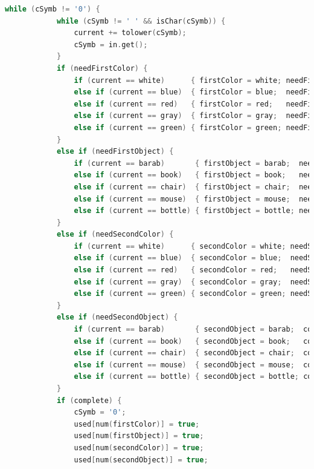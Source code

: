 \documentclass[a4paper,12pt]{article}
\begin{document}
\begin{lstlisting}[language=C++]
        while (cSymb != '0') {
            while (cSymb != ' ' && isChar(cSymb)) {
                current += tolower(cSymb);
                cSymb = in.get();
            }
            if (needFirstColor) {
                if (current == white)      { firstColor = white; needFirstObject = true; needFirstColor = false; }
                else if (current == blue)  { firstColor = blue;  needFirstObject = true; needFirstColor = false; }
                else if (current == red)   { firstColor = red;   needFirstObject = true; needFirstColor = false; }
                else if (current == gray)  { firstColor = gray;  needFirstObject = true; needFirstColor = false; }
                else if (current == green) { firstColor = green; needFirstObject = true; needFirstColor = false; }
            }
            else if (needFirstObject) {
                if (current == barab)       { firstObject = barab;  needSecondColor = true; needFirstObject = false; }
                else if (current == book)   { firstObject = book;   needSecondColor = true; needFirstObject = false; }
                else if (current == chair)  { firstObject = chair;  needSecondColor = true; needFirstObject = false; }
                else if (current == mouse)  { firstObject = mouse;  needSecondColor = true; needFirstObject = false; }
                else if (current == bottle) { firstObject = bottle; needSecondColor = true; needFirstObject = false; }
            }
            else if (needSecondColor) {
                if (current == white)      { secondColor = white; needSecondObject = true; needSecondColor = false; }
                else if (current == blue)  { secondColor = blue;  needSecondObject = true; needSecondColor = false; }
                else if (current == red)   { secondColor = red;   needSecondObject = true; needSecondColor = false; }
                else if (current == gray)  { secondColor = gray;  needSecondObject = true; needSecondColor = false; }
                else if (current == green) { secondColor = green; needSecondObject = true; needSecondColor = false; }
            }
            else if (needSecondObject) {
                if (current == barab)       { secondObject = barab;  complete = true; needSecondObject = false; }
                else if (current == book)   { secondObject = book;   complete = true; needSecondObject = false; }
                else if (current == chair)  { secondObject = chair;  complete = true; needSecondObject = false; }
                else if (current == mouse)  { secondObject = mouse;  complete = true; needSecondObject = false; }
                else if (current == bottle) { secondObject = bottle; complete = true; needSecondObject = false; }
            }
            if (complete) {
                cSymb = '0';
                used[num(firstColor)] = true;
                used[num(firstObject)] = true;
                used[num(secondColor)] = true;
                used[num(secondObject)] = true;


\end{lstlisting}
\end{document}
